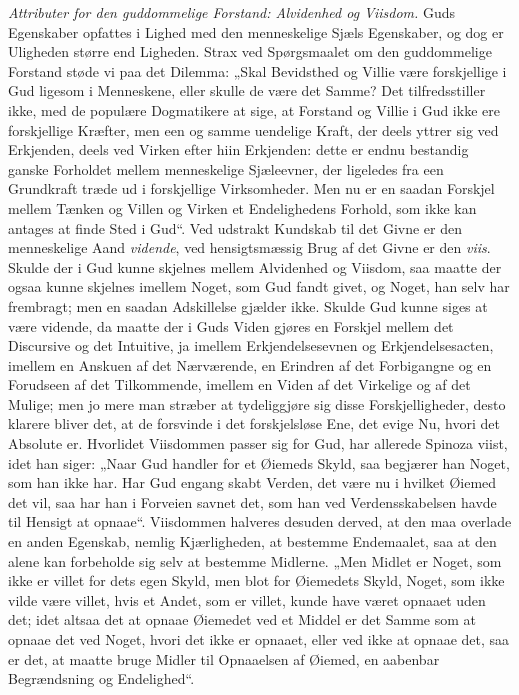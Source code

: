 \documentclass[12pt]{book}
\begin{document}
\emph{Attributer for den guddommelige Forstand: Alvidenhed og
Viisdom.} Guds Egenskaber opfattes i Lighed med den menneskelige
Sjæls Egenskaber, og dog er Uligheden større end Ligheden. Strax ved
Spørgsmaalet om den guddommelige Forstand støde vi paa det Dilemma:
„Skal Bevidsthed og Villie være forskjellige i Gud ligesom i
Menneskene, eller skulle de være det Samme? Det tilfredsstiller
ikke, med de populære Dogmatikere at sige, at Forstand og Villie i
Gud ikke ere forskjellige Kræfter, men een og samme uendelige Kraft,
der deels yttrer sig ved Erkjenden, deels ved Virken efter hiin
Erkjenden: dette er endnu bestandig ganske Forholdet mellem
menneskelige Sjæleevner, der ligeledes
fra een Grundkraft træde ud i forskjellige Virksomheder. Men nu er
en saadan Forskjel mellem Tænken og Villen og Virken et
Endelighedens Forhold, som ikke kan antages at finde Sted i Gud“.
Ved udstrakt Kundskab til det Givne er den menneskelige Aand
\emph{vidende}, ved hensigtsmæssig Brug af det Givne er den
\emph{viis}. Skulde der i Gud kunne skjelnes mellem Alvidenhed og
Viisdom, saa maatte der ogsaa kunne skjelnes imellem Noget, som Gud
fandt givet, og Noget, han selv har frembragt; men en saadan
Adskillelse gjælder ikke. Skulde Gud kunne siges at være vidende, da
maatte der i Guds Viden gjøres en Forskjel mellem det Discursive og
det Intuitive, ja imellem Erkjendelsesevnen og Erkjendelsesacten,
imellem en Anskuen af det Nærværende, en Erindren af det Forbigangne
og en Forudseen af det Tilkommende, imellem en Viden af det
Virkelige og af det Mulige; men jo mere man stræber at
tydeliggjøre sig disse Forskjelligheder, desto klarere bliver det,
at de forsvinde i det forskjelsløse Ene, det evige Nu, hvori det
Absolute er. Hvorlidet Viisdommen passer sig for Gud, har allerede
Spinoza viist, idet han siger: „Naar Gud handler for et Øiemeds
Skyld, saa begjærer han Noget, som han ikke har. Har Gud engang
skabt Verden, det være nu i hvilket Øiemed det vil, saa har han i
Forveien savnet det, som han ved Verdensskabelsen havde til Hensigt
at opnaae“. Viisdommen halveres desuden derved, at den maa overlade
en anden Egenskab, nemlig Kjærligheden, at bestemme Endemaalet, saa
at den alene kan forbeholde sig selv at bestemme Midlerne. „Men
Midlet er Noget, som ikke er villet for dets egen Skyld, men blot
for Øiemedets Skyld, Noget, som ikke vilde være villet, hvis et
Andet, som er villet, kunde have været opnaaet uden det; idet altsaa
det at opnaae Øiemedet ved et Middel er det Samme som at opnaae det
ved Noget, hvori det ikke er opnaaet, eller ved ikke at opnaae det,
saa er det, at maatte bruge
Midler til Opnaaelsen af Øiemed, en aabenbar Begrændsning og
Endelighed“.
\end{document}
